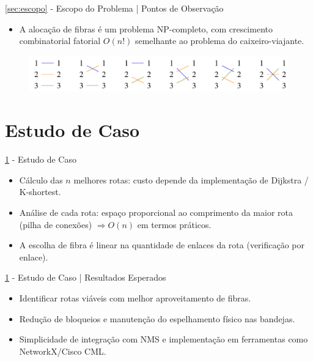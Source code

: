\documentclass[aspectratio=169,xcolor=dvipsnames]{beamer}
\begin{document}
\begin{frame}{\ref{sec:escopo} - Escopo do Problema | Pontos de Observação}
  \begin{itemize}
    \item A alocação de fibras é um problema NP-completo, com crescimento combinatorial fatorial $O(n!)$ semelhante ao problema do caixeiro-viajante.
  \end{itemize}
  \begin{figure}
    \includegraphics[width=0.80\linewidth]{../images/combinacoes_possiveis.png}
  \end{figure}
\end{frame}

\section{Estudo de Caso}\label{sec:estudo_de_caso}
\begin{frame}{\ref{sec:estudo_de_caso} - Estudo de Caso}
  \begin{itemize}
    \item Cálculo das $n$ melhores rotas: custo depende da implementação de Dijkstra / K-shortest.
    \item Análise de cada rota: espaço proporcional ao comprimento da maior rota (pilha de conexões) $\Rightarrow O(n)$ em termos práticos.
    \item A escolha de fibra é linear na quantidade de enlaces da rota (verificação por enlace).
  \end{itemize}
\end{frame}

\begin{frame}{\ref{sec:estudo_de_caso} - Estudo de Caso | Resultados Esperados}
  \begin{itemize}
    \item Identificar rotas viáveis com melhor aproveitamento de fibras.
    \item Redução de bloqueios e manutenção do espelhamento físico nas bandejas.
    \item Simplicidade de integração com NMS e implementação em ferramentas como NetworkX/Cisco CML.
  \end{itemize}
\end{frame}
\end{document}
